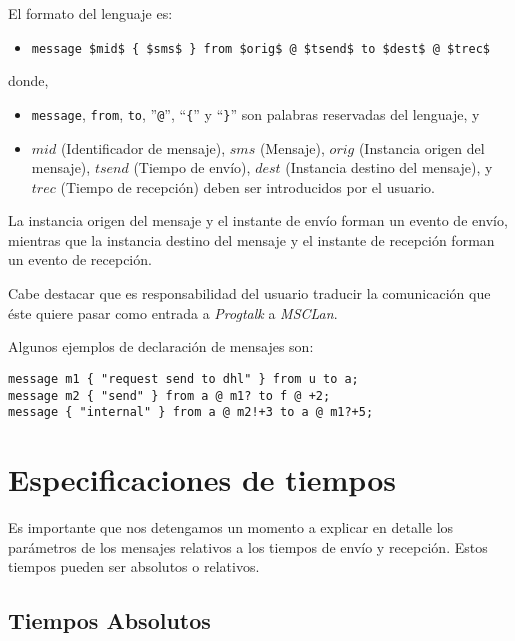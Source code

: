 El formato del lenguaje es:

\begin{itemize}
\item \lstinline[mathescape]!message $mid$ { $sms$ } from $orig$ @ $tsend$ to $dest$ @ $trec$!
\end{itemize}

donde,
\begin{itemize}
\item \lstinline{message}, \lstinline{from}, \lstinline{to},
  ''\lstinline{@}'', ``\lstinline!{!'' y ``\lstinline!}!'' son
  palabras reservadas del lenguaje, y
\item $mid$ (Identificador de mensaje), $sms$ (Mensaje), $orig$
  (Instancia origen del mensaje), $tsend$ (Tiempo de envío), $dest$
  (Instancia destino del mensaje), y $trec$ (Tiempo de recepción)
  deben ser introducidos por el usuario.
\end{itemize}

La instancia origen del mensaje y el instante de envío forman un
evento de envío, mientras que la instancia destino del mensaje y el
instante de recepción forman un evento de recepción.

Cabe destacar que es responsabilidad del usuario traducir la
comunicación que éste quiere pasar como entrada a \textit{Progtalk} a
\textit{MSCLan}.

Algunos ejemplos de declaración de mensajes son:
\begin{lstlisting}
message m1 { "request send to dhl" } from u to a;
message m2 { "send" } from a @ m1? to f @ +2;
message { "internal" } from a @ m2!+3 to a @ m1?+5;
\end{lstlisting}

\section{Especificaciones de tiempos}\label{sec:Tiempos}

Es importante que nos detengamos un momento a explicar en detalle los
parámetros de los mensajes relativos a los tiempos de envío y
recepción. Estos tiempos pueden ser absolutos o relativos.

\subsection{Tiempos Absolutos}


